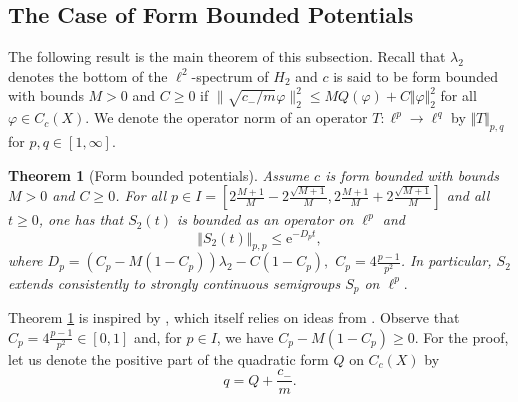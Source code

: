 \documentclass[10pt]{amsart}
\newtheorem{theorem}{Theorem}[section]
\theoremstyle{definition}
\begin{document}
\subsection{The Case of Form Bounded Potentials}




The following result is the main theorem of this subsection. Recall that $\lambda_2$ denotes the bottom of the $\ell^2$-spectrum of $ H_2$ and $c$ is said to be form bounded with bounds $M>0$ and $C\geq 0$ if $ \| \sqrt{c_-/m}\varphi\|_2^2\leq M Q(\varphi)+C\Vert\varphi\Vert^2_2$ for all $\varphi\in C_c(X)$. We denote the operator norm of an operator $T:\ell^p\rightarrow\ell^q$ by $\Vert T\Vert_{p,q}$ for $p,q\in[1,\infty].$


\begin{theorem}[Form bounded potentials]\label{formboundedpotential} Assume $c$ is form bounded with bounds $M>0$ and $C\geq 0$.
    For all $p\in I = [2\frac{M+1}{M}-2\frac{\sqrt{M+1}}{M},2\frac{M+1}{M}+2\frac{\sqrt{M+1}}{M}]$ and all $t\geq0$, one has that $S_2(t)$ is bounded as an operator on $\ell^p$ and \[\Vert S_2(t)\Vert_{p,p}\leq \mathrm{e}^{-D_pt},\]  where $D_p =\left(C_p-M(1-C_p)\right)\lambda_2-C(1-C_p),$ $C_p = 4\frac{p-1}{p^2}$.  In particular, $S_2$ extends consistently to strongly continuous semigroups $S_p$ on $\ell^p.$
\end{theorem}

Theorem \ref{formboundedpotential} is inspired by \cite[Proposition 3.3]{Magniez}, which itself relies on ideas from \cite{LiSe}.
Observe that $C_p = 4\frac{p-1}{p^2}\in [0,1]$ and, for $p\in I$, we have  $C_p-M(1-C_p)\geq 0$. 
 For the proof, let us denote the positive part of the  quadratic form $Q$ on $C_c(X)$ by
 \[q = {Q}+\frac{c_-}{m}.\]
\end{document}
